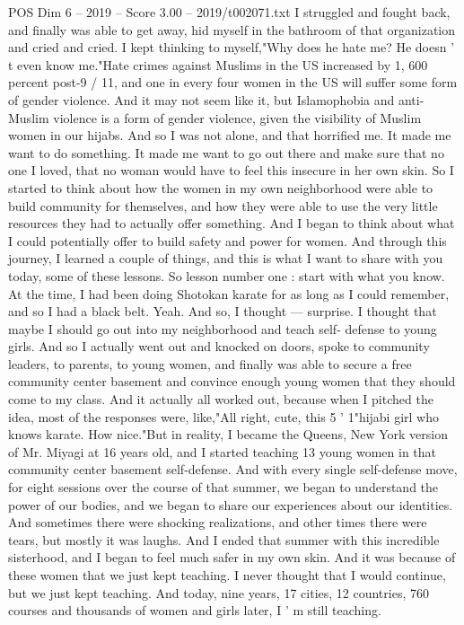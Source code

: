 \begin{textsample}{POS Dim 6 – 2019 – Score 3.00 – 2019/t002071.txt}
I struggled and fought back, and finally was able to get away, hid myself in the bathroom of that organization and cried and cried.
I kept thinking to myself,"Why does he hate me?
He doesn ' t even know me."Hate crimes against Muslims in the US increased by 1, 600 percent post-9 / 11, and one in every four women in the US will suffer some form of gender violence.
And it may not seem like it, but Islamophobia and anti-Muslim violence is a form of gender violence, given the visibility of Muslim women in our hijabs.
And so I was not alone, and that horrified me.
It made me want to do something.
It made me want to go out there and make sure that no one I loved, that no woman would have to feel this insecure in her own skin.
So I started to think about how the women in my own neighborhood were able to build community for themselves, and how they were able to use the very little resources they had to actually offer something.
And I began to think about what I could potentially offer to build safety and power for women.
And through this journey, I learned a couple of things, and this is what I want to share with you today, some of these lessons.
So lesson number one : start with what you know.
At the time, I had been doing Shotokan karate for as long as I could remember, and so I had a black belt.
Yeah.
And so, I thought — surprise.
I thought that maybe I should go out into my neighborhood and teach self- defense to young girls.
And so I actually went out and knocked on doors, spoke to community leaders, to parents, to young women, and finally was able to secure a free community center basement and convince enough young women that they should come to my class.
And it actually all worked out, because when I pitched the idea, most of the responses were, like,"All right, cute, this 5 ' 1"hijabi girl who knows karate.
How nice."But in reality, I became the Queens, New York version of Mr.
Miyagi at 16 years old, and I started teaching 13 young women in that community center basement self-defense.
And with every single self-defense move, for eight sessions over the course of that summer, we began to understand the power of our bodies, and we began to share our experiences about our identities.
And sometimes there were shocking realizations, and other times there were tears, but mostly it was laughs.
And I ended that summer with this incredible sisterhood, and I began to feel much safer in my own skin.
And it was because of these women that we just kept teaching.
I never thought that I would continue, but we just kept teaching.
And today, nine years, 17 cities, 12 countries, 760 courses and thousands of women and girls later, I ' m still teaching.

\end{textsample}
